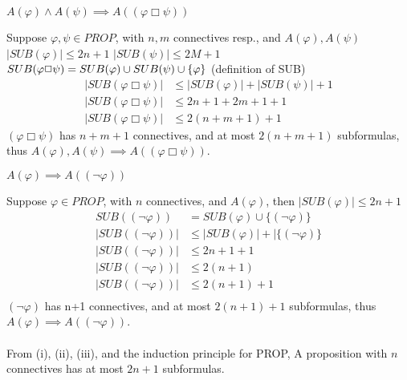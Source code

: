 \documentclass{article}
\begin{document}
\begin{description*}
\item[\hspace{2em}(ii)] $A(\varphi) \wedge A(\psi) \implies A((\varphi \Box \psi))$
\end{description*}

Suppose $\varphi,\psi \in PROP$, with $n,m$ connectives resp., and $A(\varphi),A(\psi)$ \\
$|SUB(\varphi)| \leq 2n+1$ \hspace{2em} $|SUB(\psi)| \leq 2M+1$ \\
$SUB(\varphi \Box \psi) = SUB(\varphi) \cup SUB(\psi) \cup \{\varphi \box \psi\}$ (definition of SUB)\\
\begin{align*}
|SUB(\varphi \Box \psi)| &\leq |SUB(\varphi)| + |SUB(\psi)| + 1 \\
|SUB(\varphi \Box \psi)| &\leq 2n + 1 + 2m + 1 + 1 \\
|SUB(\varphi \Box \psi)| &\leq 2(n+m+1)+1
\end{align*}
$(\varphi \Box \psi)$ has $n + m + 1$ connectives, and at most $2(n+m+1)$ subformulas, thus $A(\varphi), A(\psi) \implies A((\varphi \Box \psi))$.

\begin{description*}
\item[\hspace{2em}(iii)] $A(\varphi) \implies A((\lnot \varphi))$
\end{description*}

Suppose $\varphi \in PROP$, with $n$ connectives, and $A(\varphi)$, then $|SUB(\varphi)| \leq 2n+1$ \\

\begin{align*}
SUB((\lnot \varphi)) &= SUB(\varphi) \cup \{(\lnot \varphi)\} \\
|SUB((\lnot \varphi))| &\leq |SUB(\varphi)| + |\{(\lnot \varphi)\} \\
|SUB((\lnot \varphi))| &\leq 2n + 1 + 1 \\ 
|SUB((\lnot \varphi))| &\leq 2(n+1) \\ 
|SUB((\lnot \varphi))| &\leq 2(n+1) + 1\\ 
\end{align*}
$(\lnot \varphi)$ has n+1 connectives, and at most $2(n+1)+1$ subformulas, thus $A(\varphi) \implies A((\lnot \varphi))$.\\ \\
From (i), (ii), (iii), and the induction principle for PROP, A proposition with $n$ connectives has at most $2n+1$ subformulas. 
\end{document}
